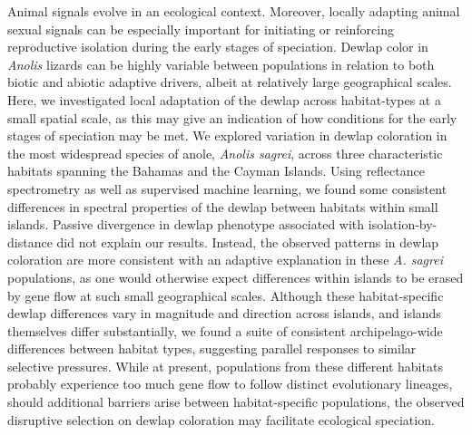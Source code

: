 Animal signals evolve in an ecological context. Moreover, locally adapting animal sexual signals can be especially important for initiating or reinforcing reproductive isolation during the early stages of speciation. Dewlap color in \textit{Anolis} lizards can be highly variable between populations in relation to both biotic and abiotic adaptive drivers, albeit at relatively large geographical scales. Here, we investigated local adaptation of the dewlap across habitat-types at a small spatial scale, as this may give an indication of how conditions for the early stages of speciation may be met. We explored variation in dewlap coloration in the most widespread species of anole, \textit{Anolis sagrei}, across three characteristic habitats spanning the Bahamas and the Cayman Islands. Using reflectance spectrometry as well as supervised machine learning, we found some consistent differences in spectral properties of the dewlap between habitats within small islands. Passive divergence in dewlap phenotype associated with isolation-by-distance did not explain our results. Instead, the observed patterns in dewlap coloration are more consistent with an adaptive explanation in these \textit{A. sagrei} populations, as one would otherwise expect differences within islands to be erased by gene flow at such small geographical scales. Although these habitat-specific dewlap differences vary in magnitude and direction across islands, and islands themselves differ substantially, we found a suite of consistent archipelago-wide differences between habitat types, suggesting parallel responses to similar selective pressures. While at present, populations from these different habitats probably experience too much gene flow to follow distinct evolutionary lineages, should additional barriers arise between habitat-specific populations, the observed disruptive selection on dewlap coloration may facilitate ecological speciation.